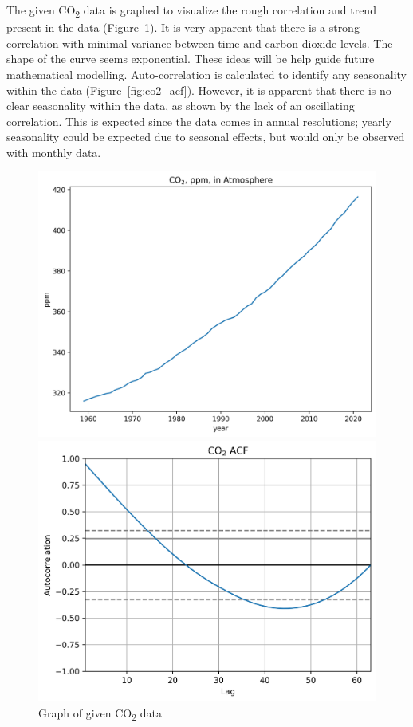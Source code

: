 \documentclass[12pt]{mcmthesis}
\begin{document}
    The given CO\textsubscript{2} data is graphed to visualize the rough correlation and trend present in the data (Figure~\ref{fig:co2}). It is very apparent that there is a strong correlation with minimal variance between time and carbon dioxide levels. The shape of the curve seems exponential. These ideas will be help guide future mathematical modelling.
    Auto-correlation is calculated to identify any seasonality within the data (Figure~\ref{fig:co2_acf}). However, it is apparent that there is no clear seasonality within the data, as shown by the lack of an oscillating correlation. This is expected since the data comes in annual resolutions; yearly seasonality could be expected due to seasonal effects, but would only be observed with monthly data.

    \begin{figure}[h]
        \centering
        \begin{minipage}{.5\textwidth}
            \centering
            \includegraphics[width=\textwidth]{co2}%
            \caption{Graph of given CO\textsubscript{2} data}
            \label{fig:co2}
        \end{minipage}%
        \begin{minipage}{.5\textwidth}
            \centering
            \includegraphics[width=\textwidth]{co2_acf}%

\end{minipage}
\end{figure}
\end{document}
